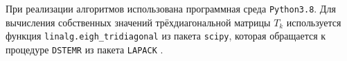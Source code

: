 При реализации алгоритмов использована программная среда \texttt{Python3.8}.
Для вычисления собственных значений трёхдиагональной матрицы $ T_k $ используется функция \texttt{linalg.eigh\_tridiagonal} из пакета \texttt{scipy}, которая обращается к процедуре \texttt{DSTEMR} из пакета \texttt{LAPACK} \cite{dhillon2003orthogonal}.
